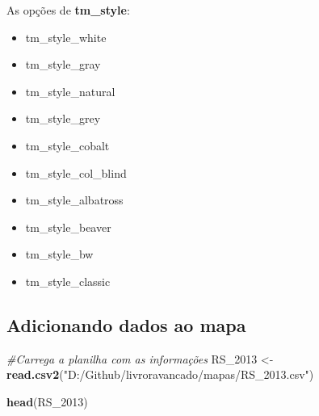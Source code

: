 \documentclass[12pt,brazil,]{book}
\newenvironment{Shaded}{\begin{snugshade}}{\end{snugshade}}
\newcommand{\CommentTok}[1]{\textcolor[rgb]{0.56,0.35,0.01}{\textit{#1}}}
\newcommand{\DecValTok}[1]{\textcolor[rgb]{0.00,0.00,0.81}{#1}}
\newcommand{\KeywordTok}[1]{\textcolor[rgb]{0.13,0.29,0.53}{\textbf{#1}}}
\newcommand{\NormalTok}[1]{#1}
\newcommand{\StringTok}[1]{\textcolor[rgb]{0.31,0.60,0.02}{#1}}
\providecommand{\tightlist}{%
  \setlength{\itemsep}{0pt}\setlength{\parskip}{0pt}}
\begin{document}
As opções de \textbf{tm\_style}:

\begin{itemize}
\tightlist
\item
  tm\_style\_white
\item
  tm\_style\_gray
\item
  tm\_style\_natural
\item
  tm\_style\_grey
\item
  tm\_style\_cobalt
\item
  tm\_style\_col\_blind
\item
  tm\_style\_albatross
\item
  tm\_style\_beaver
\item
  tm\_style\_bw
\item
  tm\_style\_classic
\end{itemize}

\hypertarget{adicionando-dados-ao-mapa}{%
\subsection{Adicionando dados ao mapa}\label{adicionando-dados-ao-mapa}}

\begin{Shaded}
\begin{Highlighting}[]
\CommentTok{#Carrega a planilha com as informações}
\NormalTok{RS_}\DecValTok{2013}\NormalTok{ <-}\StringTok{ }\KeywordTok{read.csv2}\NormalTok{(}\StringTok{"D:/Github/livroravancado/mapas/RS_2013.csv"}\NormalTok{) }

\KeywordTok{head}\NormalTok{(RS_}\DecValTok{2013}\NormalTok{)}
\end{Highlighting}
\end{Shaded}
\end{document}
